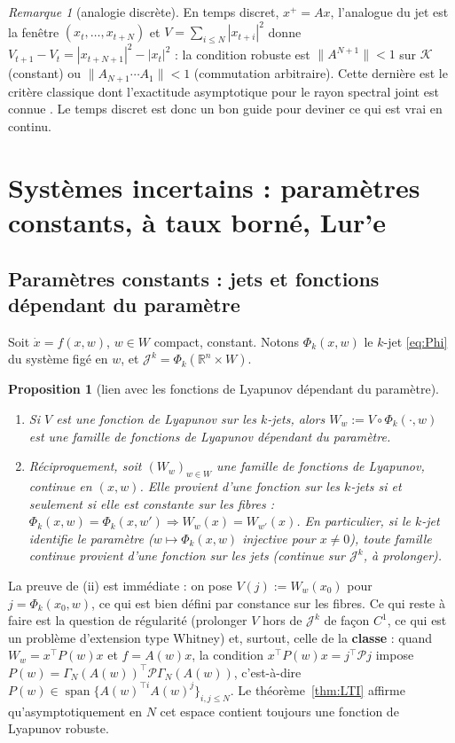 \documentclass[11pt,a4paper]{article}
\newtheorem{proposition}[theorem]{Proposition}
\theoremstyle{definition}
\theoremstyle{remark}
\newtheorem{remark}[theorem]{Remarque}
\newcommand{\R}{\mathbb{R}}
\newcommand{\Jet}{\mathcal{J}}
\newcommand{\tr}{^{\top}}
\begin{document}
\begin{remark}[analogie discrète]
En temps discret, $x^+ = Ax$, l'analogue du jet est la fenêtre $(x_t,\dots,x_{t+N})$ et $V=\sum_{i\le N}|x_{t+i}|^2$ donne $V_{t+1}-V_t = |x_{t+N+1}|^2-|x_t|^2$ : la condition robuste est $\|A^{N+1}\|<1$ sur $\mathcal K$ (constant) ou $\|A_{N+1}\cdots A_1\|<1$ (commutation arbitraire). Cette dernière est le critère classique dont l'exactitude asymptotique pour le rayon spectral joint est connue \cite{AJPR}. Le temps discret est donc un bon guide pour deviner ce qui est vrai en continu.
\end{remark}

\section{Systèmes incertains : paramètres constants, à taux borné, Lur'e}

\subsection{Paramètres constants : jets et fonctions dépendant du paramètre}
Soit $\dot x = f(x,w)$, $w\in W$ compact, constant. Notons $\Phi_k(x,w)$ le $k$-jet \eqref{eq:Phi} du système figé en $w$, et $\Jet^k = \Phi_k(\R^n\times W)$.

\begin{proposition}[lien avec les fonctions de Lyapunov dépendant du paramètre]\label{prop:PDLF}
\begin{enumerate}[nosep,label=(\roman*)]
\item Si $V$ est une fonction de Lyapunov sur les $k$-jets, alors $W_w := V\circ\Phi_k(\cdot,w)$ est une famille de fonctions de Lyapunov dépendant du paramètre.
\item Réciproquement, soit $(W_w)_{w\in W}$ une famille de fonctions de Lyapunov, continue en $(x,w)$. Elle provient d'une fonction sur les $k$-jets si et seulement si elle est \emph{constante sur les fibres} : $\Phi_k(x,w) = \Phi_k(x,w')\Rightarrow W_w(x) = W_{w'}(x)$. En particulier, si le $k$-jet \emph{identifie} le paramètre ($w\mapsto\Phi_k(x,w)$ injective pour $x\neq0$), toute famille continue provient d'une fonction sur les jets (continue sur $\Jet^k$, à prolonger).
\end{enumerate}
\end{proposition}
La preuve de (ii) est immédiate : on pose $V(j) := W_{w}(x_0)$ pour $j = \Phi_k(x_0,w)$, ce qui est bien défini par constance sur les fibres. Ce qui reste à faire est la question de régularité (prolonger $V$ hors de $\Jet^k$ de façon $C^1$, ce qui est un problème d'extension type Whitney) et, surtout, celle de la \textbf{classe} : quand $W_w = x\tr P(w)x$ et $f = A(w)x$, la condition $x\tr P(w)x = j\tr\mathcal Pj$ impose $P(w) = \Gamma_N(A(w))\tr\mathcal P\Gamma_N(A(w))$, c'est-à-dire $P(w)\in\operatorname{span}\{A(w)^{\top i}A(w)^j\}_{i,j\le N}$. Le théorème~\ref{thm:LTI} affirme qu'asymptotiquement en $N$ cet espace contient toujours une fonction de Lyapunov robuste.
\end{document}
